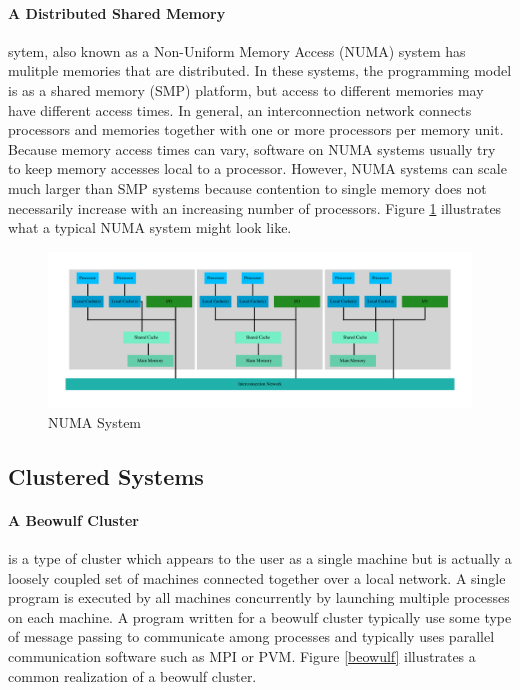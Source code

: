 \documentclass[11pt]{book}
\begin{document}
\paragraph{A Distributed Shared Memory} sytem, also known as a Non-Uniform Memory Access
(NUMA) system has mulitple memories that are distributed.  In these systems, the
programming model is as a shared memory (SMP) platform, but access to different memories
may have different access times.  In general, an interconnection network connects
processors and memories together with one or more processors per memory unit.  Because
memory access times can vary, software on NUMA systems usually try to keep memory accesses
local to a processor.  However, NUMA systems can scale much larger than SMP systems
because contention to single memory does not necessarily increase with an increasing
number of processors.  Figure \ref{distributed} illustrates what a typical NUMA system
might look like.

\begin{figure}
  \centering
  \includegraphics[width=\textwidth,quiet]{figs/graphviz/distributed.pdf}
  \caption{NUMA System}\label{distributed}
\end{figure}

\subsection{Clustered Systems}

\paragraph{A Beowulf Cluster} is a type of cluster which appears to the user as a single
machine but is actually a loosely coupled set of machines connected together over a local
network.  A single program is executed by all machines concurrently by launching multiple
processes on each machine.  A program written for a beowulf cluster typically use some
type of message passing to communicate among processes and typically uses parallel
communication software such as MPI or PVM.  Figure \ref{beowulf} illustrates a common
realization of a beowulf cluster.
\end{document}
